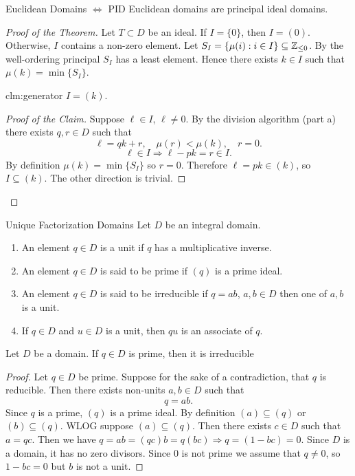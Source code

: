 \documentclass[twoside, openright, fontsize=10pt, headings=big]{scrbook}
\begin{document}
\begin{theorem}{Euclidean Domains $\Leftrightarrow$ PID}{}
    Euclidean domains are principal ideal domains.
\end{theorem}
\begin{proof}[Proof of the Theorem]
    Let $T\subset D$ be an ideal. If $I=\{0\}$, then $I=(0)$. Otherwise, $I$ contains a non-zero element. Let $S_I=\{\mu(i):i\in I\}\subseteq\mathbb{Z}_{\leq0}$. By the well-ordering principal $S_I$ has a least element. Hence there exists $k\in I$ such that $\mu(k)=\min\{S_I\}$.
    
    \begin{claim}{}{clm:generator}
        $I=(k)$.
    \end{claim} 
    
    \begin{proof}[Proof of the Claim]
        Suppose $\ell\in I$, $\ell\neq0$. By the division algorithm (part a) there exists $q,r\in D$ such that 
        \[
            \ell=qk+r,\quad \mu(r)<\mu(k),\quad r=0.
        \]
        \[
            \ell\in I\Rightarrow \ell-pk=r\in I.
        \]
        By definition $\mu(k)=\min\{S_I\}$ so $r=0$. Therefore $\ell=pk\in(k)$, so $I\subseteq(k)$. The other direction is trivial.
    \end{proof}
\end{proof}
\begin{definition}{Unique Factorization Domains}{}
    Let $D$ be an integral domain.
    \begin{enumerate}[label=(\alph*)]
        \item An element $q\in D$ is a unit if $q$ has a multiplicative inverse.
        \item An element $q\in D$ is said to be prime if $(q)$ is a prime ideal.
        \item An element $q\in D$ is said to be irreducible if $q=ab$, $a,b\in D$ then one of $a,b$ is a unit.
        \item If $q\in D$ and $u\in D$ is a unit, then $qu$ is an associate of $q$. 
    \end{enumerate}
\end{definition}
\begin{proposition}{}{}
    Let $D$ be a domain. If $q\in D$ is prime, then it is irreducible
\end{proposition}
\begin{proof}
    Let $q\in D$ be prime. Suppose for the sake of a contradiction, that $q$ is reducible. Then there exists non-units $a,b\in D$ such that 
    \[
        q=ab.
    \]
    Since $q$ is a prime, $(q)$ is a prime ideal. By definition $(a)\subseteq (q)$ or $(b)\subseteq(q)$. WLOG suppose $(a)\subseteq(q)$. Then there exists $c\in D$ such that $a=qc$. Then we have $q=ab=(qc)b=q(bc)\Rightarrow q=(1-bc)=0$. Since $D$ is a domain, it has no zero divisors. Since 0 is not prime we assume that $q\neq0$, so $1-bc=0$ but $b$ is not a unit.
\end{proof}
\end{document}
